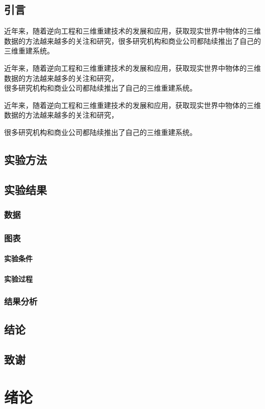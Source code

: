 \documentclass{ctexbook}
\begin{document}
    \section{引言}
    近年来，随着逆向工程和三维重建技术的发展和应用，获取现实世界中物体的三维数据的方法越来越多的关注和研究，很多研究机构和商业公司都陆续推出了自己的三维重建系统。

    近年来，随着逆向工程和三维重建技术的发展和应用，获取现实世界中物体的三维数据的方法越来越多的关注和研究，\\很多研究机构和商业公司都陆续推出了自己的三维重建系统。

    近年来，随着逆向工程和三维重建技术的发展和应用，获取现实世界中物体的三维数据的方法越来越多的关注和研究，\par 很多研究机构和商业公司都陆续推出了自己的三维重建系统。
    \section{实验方法}
    \section{实验结果}
    \subsection{数据}
    \subsection{图表}
    \subsubsection{实验条件}
    \subsubsection{实验过程}
    \subsection{结果分析}
    \section{结论}
    \section{致谢}


    \tableofcontents

    
    \chapter{绪论}
\end{document}
